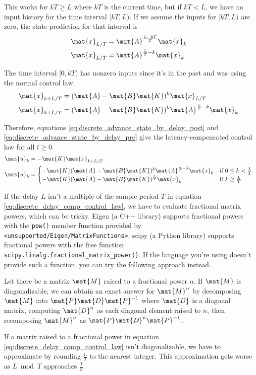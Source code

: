 This works for $kT \geq L$ where $kT$ is the current time, but if $kT < L$, we
have no input history for the time interval $[kT, L)$. If we assume the inputs
for $[kT, L)$ are zero, the state prediction for that interval is
\begin{align*}
  \mat{x}_{L/T} &= \mat{A}^\frac{L - kT}{T} \mat{x}_k \\
  \mat{x}_{L/T} &= \mat{A}^{\frac{L}{T} - k} \mat{x}_k
\end{align*}

The time interval $[0, kT)$ has nonzero inputs since it's in the past and was
using the normal control law.
\begin{align}
  \mat{x}_{k + L/T} &= (\mat{A} - \mat{B}\mat{K})^k \mat{x}_{L/T} \nonumber \\
  \mat{x}_{k + L/T} &= (\mat{A} - \mat{B}\mat{K})^k
    \mat{A}^{\frac{L}{T} - k} \mat{x}_k
    \label{eq:discrete_advance_state_by_delay_pre}
\end{align}

Therefore, equations \eqref{eq:discrete_advance_state_by_delay_post} and
\eqref{eq:discrete_advance_state_by_delay_pre} give the latency-compensated
control law for all $t \geq 0$.
\begin{align}
  \mat{u}_k &= -\mat{K} \mat{x}_{k + L/T} \nonumber \\
  \mat{u}_k &=
  \begin{cases}
    -\mat{K} (\mat{A} - \mat{B}\mat{K})^k \mat{A}^{\frac{L}{T} - k} \mat{x}_k &
      \text{if } 0 \leq k < \frac{L}{T} \\
    -\mat{K} (\mat{A} - \mat{B}\mat{K})^\frac{L}{T} \mat{x}_k &
      \text{if } k \geq \frac{L}{T}
  \end{cases}
  \label{eq:discrete_delay_comp_control_law}
\end{align}

If the delay $L$ isn't a multiple of the sample period $T$ in equation
\eqref{eq:discrete_delay_comp_control_law}, we have to evaluate fractional
matrix powers, which can be tricky. Eigen (a C++ library) supports fractional
powers with the \texttt{pow()} member function provided by
\texttt{<unsupported/Eigen/MatrixFunctions>}. scipy (a Python library) supports
fractional powers with the free function
\texttt{scipy.linalg.fractional\_matrix\_power()}. If the language you're using
doesn't provide such a function, you can try the following approach instead.

Let there be a matrix $\mat{M}$ raised to a fractional power $n$. If $\mat{M}$
is diagonalizable, we can obtain an exact answer for $\mat{M}^n$ by decomposing
$\mat{M}$ into $\mat{P}\mat{D}\mat{P}^{-1}$ where $\mat{D}$ is a diagonal
matrix, computing $\mat{D}^n$ as each diagonal element raised to $n$, then
recomposing $\mat{M}^n$ as $\mat{P}\mat{D}^n\mat{P}^{-1}$.

If a matrix raised to a fractional power in equation
\eqref{eq:discrete_delay_comp_control_law} isn't diagonalizable, we have to
approximate by rounding $\frac{L}{T}$ to the nearest integer. This approximation
gets worse as $L \bmod T$ approaches $\frac{T}{2}$.
